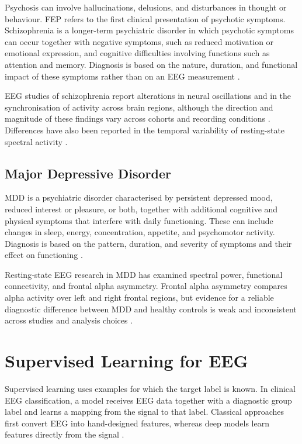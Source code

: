 Psychosis can involve hallucinations, delusions, and disturbances in thought or behaviour. FEP refers to the first clinical presentation of psychotic symptoms. Schizophrenia is a longer-term psychiatric disorder in which psychotic symptoms can occur together with negative symptoms, such as reduced motivation or emotional expression, and cognitive difficulties involving functions such as attention and memory. Diagnosis is based on the nature, duration, and functional impact of these symptoms rather than on an EEG measurement \parencite{uhlhaasAbnormalNeuralOscillations2010}.

EEG studies of schizophrenia report alterations in neural oscillations and in the synchronisation of activity across brain regions, although the direction and magnitude of these findings vary across cohorts and recording conditions \parencite{uhlhaasAbnormalNeuralOscillations2010}. Differences have also been reported in the temporal variability of resting-state spectral activity \parencite{raczReducedTemporalVariability2025}.

\subsection{Major Depressive Disorder}\label{sec:bg_mdd}

MDD is a psychiatric disorder characterised by persistent depressed mood, reduced interest or pleasure, or both, together with additional cognitive and physical symptoms that interfere with daily functioning. These can include changes in sleep, energy, concentration, appetite, and psychomotor activity. Diagnosis is based on the pattern, duration, and severity of symptoms and their effect on functioning \parencite{vanderVinneFrontalAlphaAsymmetry2017}.

Resting-state EEG research in MDD has examined spectral power, functional connectivity, and frontal alpha asymmetry. Frontal alpha asymmetry compares alpha activity over left and right frontal regions, but evidence for a reliable diagnostic difference between MDD and healthy controls is weak and inconsistent across studies and analysis choices \parencite{vanderVinneFrontalAlphaAsymmetry2017,kolodziejNoRelationshipFrontalAlpha2021}.

\section{Supervised Learning for EEG}\label{sec:bg_supervised}

Supervised learning uses examples for which the target label is known. In clinical EEG classification, a model receives EEG data together with a diagnostic group label and learns a mapping from the signal to that label. Classical approaches first convert EEG into hand-designed features, whereas deep models learn features directly from the signal \parencite{craikDeepLearningElectroencephalogram2019,royDeepLearningBasedElectroencephalography2019}.

